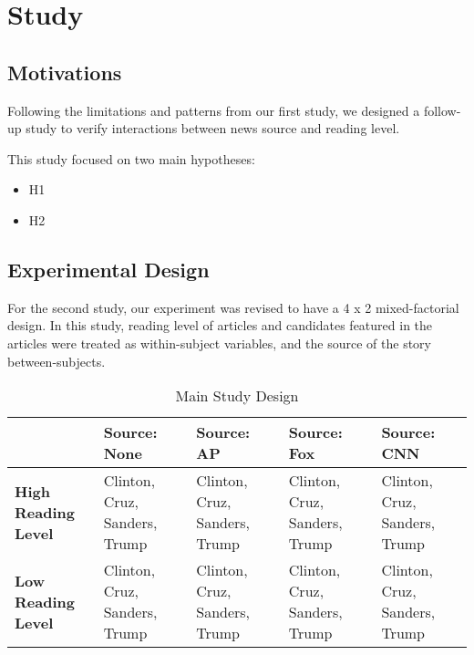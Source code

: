 \chapter{Study}

\section{Motivations}  
Following the limitations and patterns from our first study, we designed a follow-up study to verify interactions between news source and reading level.

This study focused on two main hypotheses:

\begin{itemize}
  \item H1
  \item H2
\end{itemize}


\section{Experimental Design}

For the second study, our experiment was revised to have a 4 x 2 mixed-factorial design.
In this study, reading level of articles and candidates featured in the articles were treated as within-subject variables, and the source of the story between-subjects.

\begin{center}
\begin{table}
\begin{tabular}{ | m{10em} | m{7em}| m{7em} | m{7em} | m{7em} | } 
 \hline
  & \textbf{Source: None} & \textbf{Source: AP} & \textbf{Source: Fox} & \textbf{Source: CNN} \\
 \hline
 \textbf{High Reading Level} & Clinton, Cruz, Sanders, Trump & Clinton, Cruz, Sanders, Trump & Clinton, Cruz, Sanders, Trump & Clinton, Cruz, Sanders, Trump  \\ 
 \textbf{Low Reading Level} & Clinton, Cruz, Sanders, Trump & Clinton, Cruz, Sanders, Trump & Clinton, Cruz, Sanders, Trump & Clinton, Cruz, Sanders, Trump \\ 
 \hline
\end{tabular}
\caption{Main Study Design}
\label{study2}
\end{table}
\end{center}


